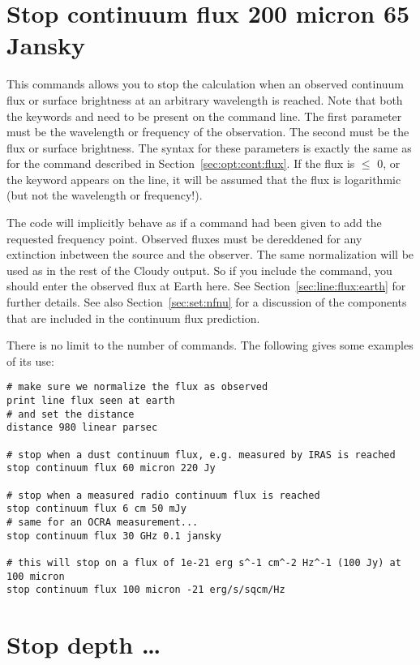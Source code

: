 \section{Stop continuum flux 200 micron 65 Jansky}

This commands allows you to stop the calculation when an observed continuum
flux or surface brightness at an arbitrary wavelength is reached. Note that
both the keywords  and  need to be
present on the command line. The first parameter must be the wavelength or
frequency of the observation. The second must be the flux or surface
brightness. The syntax for these parameters is exactly the same as for the
 command described in
Section~\ref{sec:opt:cont:flux}. If the flux is $\leq$ 0, or the keyword
 appears on the line, it will be assumed that the flux is
logarithmic (but not the wavelength or frequency!).

The code will implicitly behave as if a  command had
been given to add the requested frequency point.
Observed fluxes must be dereddened for any extinction inbetween the
source and the observer. The same normalization will be used as in the rest of
the Cloudy output. So if you include the 
command, you should enter the observed flux at Earth here. See
Section~\ref{sec:line:flux:earth} for further details. See also
Section~\ref{sec:set:nfnu} for a discussion of the components that are
included in the continuum flux prediction.

There is no limit to the number of 
commands. The following gives some examples of its use:
\begin{verbatim}
# make sure we normalize the flux as observed
print line flux seen at earth
# and set the distance
distance 980 linear parsec

# stop when a dust continuum flux, e.g. measured by IRAS is reached
stop continuum flux 60 micron 220 Jy

# stop when a measured radio continuum flux is reached
stop continuum flux 6 cm 50 mJy
# same for an OCRA measurement...
stop continuum flux 30 GHz 0.1 jansky

# this will stop on a flux of 1e-21 erg s^-1 cm^-2 Hz^-1 (100 Jy) at 100 micron
stop continuum flux 100 micron -21 erg/s/sqcm/Hz
\end{verbatim}

\section{Stop depth \dots}

